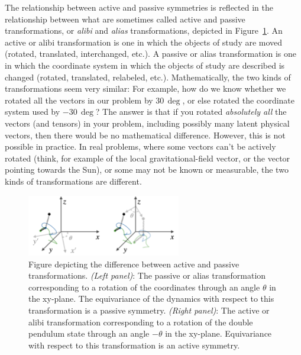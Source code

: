 \documentclass{article} %
\newcommand{\figref}[1]{Figure~\ref{#1}}
\begin{document}
The relationship between active and passive symmetries is reflected in the relationship between what are sometimes called active and passive transformations, or \emph{alibi} and \emph{alias} transformations, depicted in \figref{fig:alias}.
An active or alibi transformation is one in which the objects of study are moved (rotated, translated, interchanged, etc.).
A passive or alias transformation is one in which the coordinate system in which the objects of study are described is changed (rotated, translated, relabeled, etc.).
Mathematically, the two kinds of transformations seem very similar:
For example, how do we know whether we rotated all the vectors in our problem by $30\,\deg$, or else rotated the coordinate system used by $-30\,\deg$?
The answer is that if you rotated \emph{absolutely all} the vectors (and tensors) in your problem, including possibly many latent physical vectors, then there would be no mathematical difference. However, this is not possible in practice. 
In real problems, where some vectors can't be actively rotated (think, for example of the local gravitational-field vector, or the vector pointing towards the Sun), or some may not be known or measurable, the two kinds of transformations are different.
\begin{figure}[t!]
    \centering
    \includegraphics[width=0.6\textwidth]{alias.png}
    \caption{Figure depicting the difference between active and passive transformations. \textsl{(Left panel)}: The passive or alias transformation corresponding to a rotation of the coordinates through an angle $\theta$ in the xy-plane. The equivariance of the dynamics with respect to this transformation is a passive symmetry. \textsl{(Right panel)}: The active or alibi transformation corresponding to a rotation of the double pendulum state through an angle $-\theta$ in the xy-plane. Equivariance with respect to this transformation is an active symmetry.}
    \label{fig:alias}
\end{figure}
\end{document}
